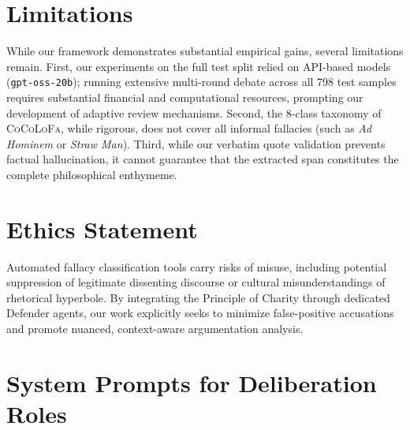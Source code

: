 \documentclass[11pt]{article}
\begin{document}
\section*{Limitations}
While our framework demonstrates substantial empirical gains, several limitations remain. First, our experiments on the full test split relied on API-based models (\texttt{gpt-oss-20b}); running extensive multi-round debate across all 798 test samples requires substantial financial and computational resources, prompting our development of adaptive review mechanisms. Second, the 8-class taxonomy of \textsc{CoCoLoFa}, while rigorous, does not cover all informal fallacies (such as \textit{Ad Hominem} or \textit{Straw Man}). Third, while our verbatim quote validation prevents factual hallucination, it cannot guarantee that the extracted span constitutes the complete philosophical enthymeme.

\section*{Ethics Statement}
Automated fallacy classification tools carry risks of misuse, including potential suppression of legitimate dissenting discourse or cultural misunderstandings of rhetorical hyperbole. By integrating the Principle of Charity through dedicated Defender agents, our work explicitly seeks to minimize false-positive accusations and promote nuanced, context-aware argumentation analysis.



\appendix

\section{System Prompts for Deliberation Roles}
\label{sec:appendix_prompts}
\end{document}
